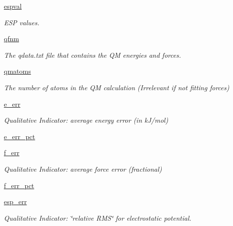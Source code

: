 \begin{DoxyCompactItemize}
\hyperlink{classforcebalance_1_1abinitio_1_1AbInitio_aba6d885086d455fce8c3d472fd08020d}{espval}
\begin{DoxyCompactList}\small\item\em E\-S\-P values. \end{DoxyCompactList}\item 
\hyperlink{classforcebalance_1_1abinitio_1_1AbInitio_ac93db408472034937e79572bf872886c}{qfnm}
\begin{DoxyCompactList}\small\item\em The qdata.\-txt file that contains the Q\-M energies and forces. \end{DoxyCompactList}\item 
\hyperlink{classforcebalance_1_1abinitio_1_1AbInitio_af0760b8d33ce9dd044ccbe68fba7a1be}{qmatoms}
\begin{DoxyCompactList}\small\item\em The number of atoms in the Q\-M calculation (Irrelevant if not fitting forces) \end{DoxyCompactList}\item 
\hyperlink{classforcebalance_1_1abinitio_1_1AbInitio_aa569290969858e189935b3de37ead3f0}{e\-\_\-err}
\begin{DoxyCompactList}\small\item\em Qualitative Indicator\-: average energy error (in k\-J/mol) \end{DoxyCompactList}\item 
\hyperlink{classforcebalance_1_1abinitio_1_1AbInitio_a4e3e525a03ab55bc004ebf0e3a0d60ce}{e\-\_\-err\-\_\-pct}
\item 
\hyperlink{classforcebalance_1_1abinitio_1_1AbInitio_a176fb2b013ecc5ab451fd3b190414c4d}{f\-\_\-err}
\begin{DoxyCompactList}\small\item\em Qualitative Indicator\-: average force error (fractional) \end{DoxyCompactList}\item 
\hyperlink{classforcebalance_1_1abinitio_1_1AbInitio_ab6ee932ad4689f538c746310939dd0bc}{f\-\_\-err\-\_\-pct}
\item 
\hyperlink{classforcebalance_1_1abinitio_1_1AbInitio_abdc625c3149cee375b56b4e0d73034fe}{esp\-\_\-err}
\begin{DoxyCompactList}\small\item\em Qualitative Indicator\-: \char`\"{}relative R\-M\-S\char`\"{} for electrostatic potential. \end{DoxyCompactList}\item 

\end{DoxyCompactItemize}
